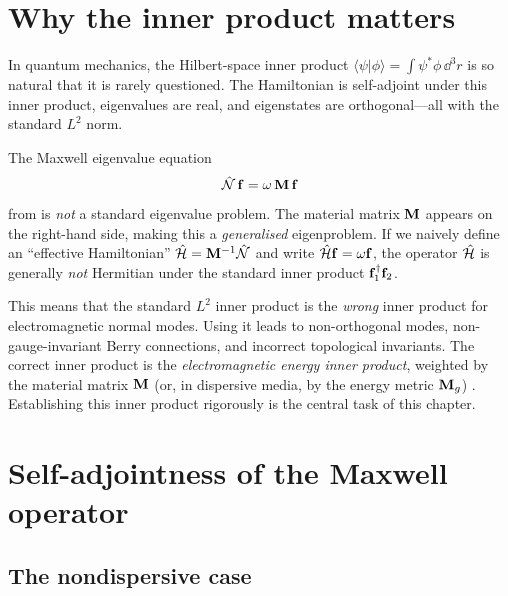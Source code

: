 
\section{Why the inner product matters}
\label{sec:ch3-why-ip}

In quantum mechanics, the Hilbert-space inner product
$\langle\psi|\phi\rangle=\int\psi^*\phi\,\dd^3r$ is so natural that it
is rarely questioned.  The Hamiltonian is self-adjoint under this inner
product, eigenvalues are real, and eigenstates are orthogonal---all
with the standard $L^2$ norm.

The Maxwell eigenvalue equation
\begin{equation}\label{eq:ch3-evp-recap}
  \hat{\mathcal{N}}\,\mathbf{f} = \omega\,\mathbf{M}\,\mathbf{f}
\end{equation}
from  is \emph{not} a standard eigenvalue
problem.  The material matrix $\mathbf{M}$ appears on the right-hand side,
making this a \emph{generalised} eigenproblem.  If we naively define an
``effective Hamiltonian'' $\hat{\mathcal{H}}=\mathbf{M}^{-1}\hat{\mathcal{N}}$ and write
$\hat{\mathcal{H}}\mathbf{f}=\omega\mathbf{f}$, the operator $\hat{\mathcal{H}}$ is generally
\emph{not} Hermitian under the standard inner product
$\mathbf{f}_1^\dagger\mathbf{f}_2$.

This means that the standard $L^2$ inner product is the \emph{wrong}
inner product for electromagnetic normal modes.  Using it leads to
non-orthogonal modes, non-gauge-invariant Berry connections, and
incorrect topological invariants.  The correct inner product is the
\emph{electromagnetic energy inner product}, weighted by the material
matrix $\mathbf{M}$ (or, in dispersive media, by the energy metric
$\mathbf{M}_g$) \cite{nittis2020equivalence}.  Establishing this inner product rigorously is the central
task of this chapter.

\section{Self-adjointness of the Maxwell operator}
\label{sec:ch3-self-adjoint}

\subsection{The nondispersive case}
\label{sec:ch3-self-adjoint-nondisp}

